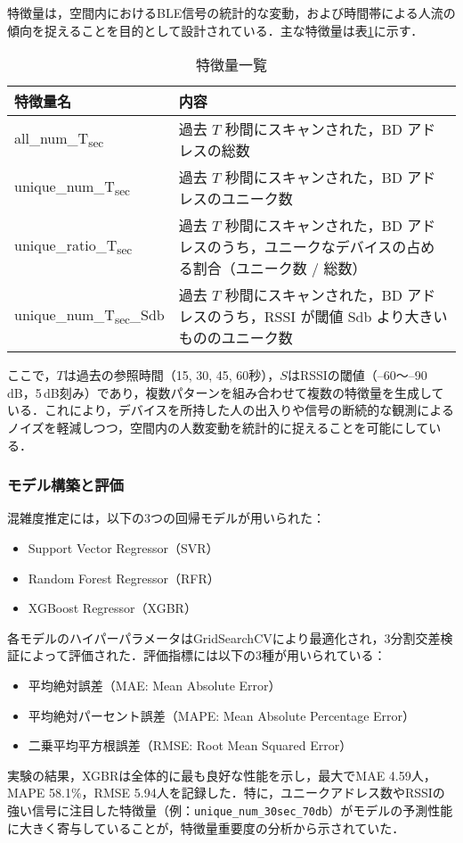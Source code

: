 特徴量は，空間内におけるBLE信号の統計的な変動，および時間帯による人流の傾向を捉えることを目的として設計されている．主な特徴量は表\ref{tbl:blece_features}に示す．

\begin{table}[tb]
	\centering
	\caption{特徴量一覧}
	\label{tbl:blece_features}
	\small
	\doublerulesep=0.3pt
    \begin{tabular}{l|p{5cm}} \hline\hline\hline
		特徴量名 & 内容 \\ \hline
		all\_num\_T\textsubscript{sec} & 過去 $T$ 秒間にスキャンされた，BD アドレスの総数\\ \hline
    unique\_num\_T\textsubscript{sec} & 過去 $T$ 秒間にスキャンされた，BD アドレスのユニーク数 \\ \hline
    unique\_ratio\_T\textsubscript{sec} & 過去 $T$ 秒間にスキャンされた，BD アドレスのうち，ユニークなデバイスの占める割合（ユニーク数 / 総数） \\ \hline
    unique\_num\_T\textsubscript{sec}\_Sdb & 過去 $T$ 秒間にスキャンされた，BD アドレスのうち，RSSI が閾値 Sdb より大きいもののユニーク数 \\ \hline\hline\hline
	\end{tabular}
\end{table}

ここで，$T$は過去の参照時間（15, 30, 45, 60秒），$S$はRSSIの閾値（--60〜--90\,dB，5\,dB刻み）であり，複数パターンを組み合わせて複数の特徴量を生成している．これにより，デバイスを所持した人の出入りや信号の断続的な観測によるノイズを軽減しつつ，空間内の人数変動を統計的に捉えることを可能にしている．

\subsubsection*{モデル構築と評価}

混雑度推定には，以下の3つの回帰モデルが用いられた：

\begin{itemize}
  \item Support Vector Regressor（SVR）
  \item Random Forest Regressor（RFR）
  \item XGBoost Regressor（XGBR）
\end{itemize}

各モデルのハイパーパラメータはGridSearchCVにより最適化され，3分割交差検証によって評価された．評価指標には以下の3種が用いられている：

\begin{itemize}
  \item 平均絶対誤差（MAE: Mean Absolute Error）
  \item 平均絶対パーセント誤差（MAPE: Mean Absolute Percentage Error）
  \item 二乗平均平方根誤差（RMSE: Root Mean Squared Error）
\end{itemize}

実験の結果，XGBRは全体的に最も良好な性能を示し，最大でMAE 4.59人，MAPE 58.1\%，RMSE 5.94人を記録した．特に，ユニークアドレス数やRSSIの強い信号に注目した特徴量（例：\texttt{unique\_num\_30sec\_70db}）がモデルの予測性能に大きく寄与していることが，特徴量重要度の分析から示されていた．
